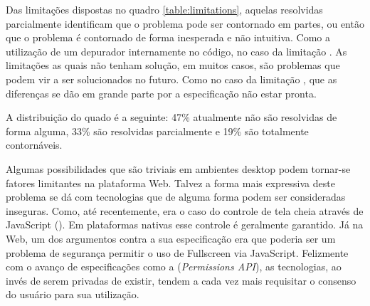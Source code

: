 Das limitações dispostas no quadro \ref{table:limitations},
aquelas resolvidas parcialmente identificam que o problema pode
ser contornado em partes, ou então que o problema é contornado
de forma inesperada e não intuitiva. Como a utilização de
um depurador internamente no código, no caso da limitação
. As limitações as
quais não tenham solução, em muitos casos, são problemas que
podem vir a ser solucionados no futuro. Como no caso da limitação
, que as diferenças se dão em grande
parte por a especificação não estar pronta.

A distribuição do quado é a seguinte: 47\% atualmente não são
resolvidas de forma alguma, 33\% são resolvidas parcialmente e 19\%
são totalmente contornáveis.

Algumas possibilidades que são triviais em ambientes desktop podem
tornar-se fatores limitantes na plataforma Web. Talvez a forma mais
expressiva deste problema se dá com tecnologias que de alguma forma
podem ser consideradas inseguras. Como, até recentemente, era o caso
do controle de tela cheia através de JavaScript (). Em plataformas nativas esse
controle é geralmente garantido. Já na Web, um dos argumentos contra
a sua especificação era que poderia ser um problema de segurança
permitir o uso de Fullscreen via JavaScript. Felizmente com o avanço de
especificações como a (\textit{Permissions API}), as tecnologias, ao
invés de serem privadas de existir, tendem a cada vez mais requisitar o
consenso do usuário para sua utilização.
